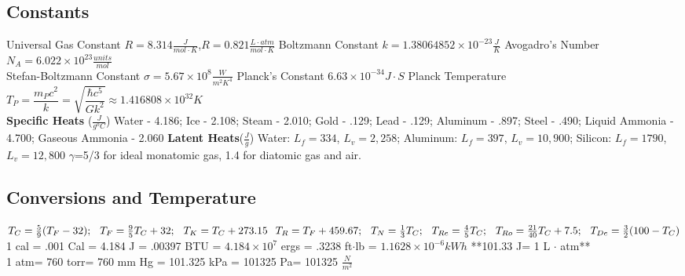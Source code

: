 \documentclass[8pt]{extarticle}
\begin{document}
\begin{small}
\section{Constants}
Universal Gas Constant $R=8.314 \frac{J}{mol \cdot K}$,$R=0.821 \frac{L\cdot atm}{mol \cdot K}$ \hspace{0.1in} Boltzmann Constant $k=1.38064852\times10^{-23}  \frac{J}{K}$ \hspace{0.1in} Avogadro's Number $N_A=6.022\times10^{23} \frac{units}{mol}$ \\
Stefan-Boltzmann Constant $\sigma=5.67\times10^8\frac{W}{m^2K^4}$ \hspace{0.1in} Planck's Constant $6.63\times10^{-34}J\cdot S$ \hspace{.1in} Planck Temperature $T_P=\dfrac{m_Pc^2}{k}=\sqrt{\dfrac{\hbar c^5}{Gk^2}}\approx1.416808\times10^{32}K$\\ \textbf{Specific Heats} ($\frac{J}{g^{o}C}$) Water - 4.186; Ice - 2.108; Steam - 2.010; Gold - .129; Lead - .129; Aluminum - .897; Steel - .490; Liquid Ammonia - 4.700; Gaseous Ammonia - 2.060 \textbf{Latent Heats}($\frac{J}{g}$) Water: $L_f=334$, $L_v=2,258$; Aluminum: $L_f=397$, $L_v=10,900$; Silicon: $L_f=1790$, $L_v=12,800$ \hspace{.1in} $\gamma$=5/3 for ideal monatomic gas, 1.4 for diatomic gas and air. 

\subsection{Conversions and Temperature}
 $T_{C}=\frac{5}{9}(T_{F}-32); \hspace{0.1in} T_{F}=\frac{9}{5}T_{C} + 32;\hspace{0.1in} T_{K}= T_{C}+273.15\hspace{0.1in} T_{R}=T_{F}+459.67;\hspace{0.1in} T_{N}=\frac{1}{3}T_{C};\hspace{0.1in} T_{Re}=\frac{4}{5}T_{C};\hspace{0.1in} T_{Ro}= \frac{21}{40}T_{C}+7.5; \hspace{0.1in} T_{De}=\frac{3}{2}(100-T_{C})$\\
1 cal = .001 Cal = 4.184 J = .00397 BTU = $4.184\times10^{7}$  ergs = .3238 ft$ \cdot$lb = $1.1628\times10^{-6} kWh$ \hspace{.1in} **101.33 J= 1 L $\cdot$ atm**\\
1 atm= 760 torr= 760 mm Hg = 101.325 kPa = 101325 Pa= 101325 $\frac{N}{m^2}$


\end{small}
\end{document}
